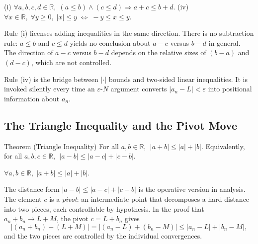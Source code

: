 \begin{remark}
(i) $\forall a,b,c,d\in\mathbb{R},\;(a\leq b)\land(c\leq d)
    \Rightarrow a+c\leq b+d$. \quad
(iv) $\forall x\in\mathbb{R},\;\forall y\geq 0,\;
    |x|\leq y\;\Leftrightarrow\;-y\leq x\leq y$.
\end{remark}

\begin{remark}
Rule (i) licenses adding inequalities in the same direction. There is no
subtraction rule: $a\leq b$ and $c\leq d$ yields no conclusion about
$a-c$ versus $b-d$ in general. The direction of $a-c$ versus $b-d$ depends
on the relative sizes of $(b-a)$ and $(d-c)$, which are not controlled.
\end{remark}

\begin{remark}
Rule (iv) is the bridge between $|\cdot|$ bounds and two-sided linear
inequalities. It is invoked silently every time an $\varepsilon$-$N$ argument
converts $|a_n-L|<\varepsilon$ into positional information about $a_n$.
\end{remark}



\subsection*{The Triangle Inequality and the Pivot Move}
\label{subsec:triangle-ineq}

\begin{theorembox}{Theorem (Triangle Inequality)}
For all $a,b\in\mathbb{R}$, $\;|a+b|\leq|a|+|b|$. Equivalently, for all
$a,b,c\in\mathbb{R}$, $\;|a-b|\leq|a-c|+|c-b|$.
\end{theorembox}

\begin{remark}
$\forall a,b\in\mathbb{R},\;|a+b|\leq|a|+|b|$.
\end{remark}

\begin{remark}
The distance form $|a-b|\leq|a-c|+|c-b|$ is the operative version in
analysis. The element $c$ is a \emph{pivot}: an intermediate point that
decomposes a hard distance into two pieces, each controllable by hypothesis.
In the proof that $a_n+b_n\to L+M$, the pivot $c=L+b_n$ gives
\[
  |(a_n+b_n)-(L+M)|
  =|(a_n-L)+(b_n-M)|
  \leq|a_n-L|+|b_n-M|,
\]
and the two pieces are controlled by the individual convergences.
\end{remark}

